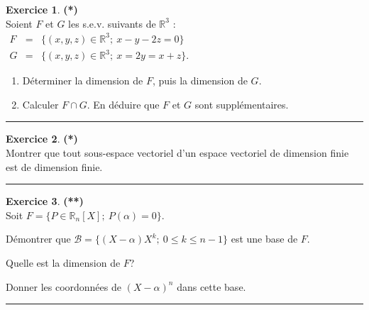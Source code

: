 \documentclass[a4paper,11pt]{article}
\theoremstyle{definition}
\newtheorem{exo}{Exercice} %
\begin{document}
\begin{minipage}{1\linewidth}
\begin{minipage}[t]{0.48\linewidth}
\begin{exo}\textbf{(*)}\quad\\[0.1cm]
Soient $F$ et $G$ les s.e.v. suivants de $\mathbb R^3$ :
$\begin{array}{ccc}
	F&=&\{(x,y,z)\in\mathbb R^3;\ x-y-2z=0\}\\
	G&=&\{(x,y,z)\in\mathbb R^3;\ x=2y=x+z\}.
\end{array}$
\begin{enumerate}
	\item Déterminer la dimension de $F$, puis la dimension de $G$.
	\item Calculer $F\cap G$. En déduire que $F$ et $G$ sont supplémentaires.
\end{enumerate}

\centering\rule{1\linewidth}{0.6pt}\end{exo}


\begin{exo}\textbf{(*)}\quad\\[0.1cm]
Montrer que tout sous-espace vectoriel d'un espace vectoriel de dimension finie
est de dimension finie.
	
\centering\rule{1\linewidth}{0.6pt}\end{exo}

\begin{exo}\textbf{(**)}\quad\\[0.1cm]
Soit $F=\{P\in\mathbb R_n[X];\ P(\alpha)=0\}$.

Démontrer que $\mathcal B=\{(X-\alpha)X^k;\ 0\leq k\leq n-1\}$
est une base de $F$. 

Quelle est la dimension de $F$? 

Donner les coordonnées de $(X-\alpha)^n$ dans cette base.
	
\centering\rule{1\linewidth}{0.6pt}\end{exo}

\end{minipage}\end{minipage} \newpage
\end{document}
